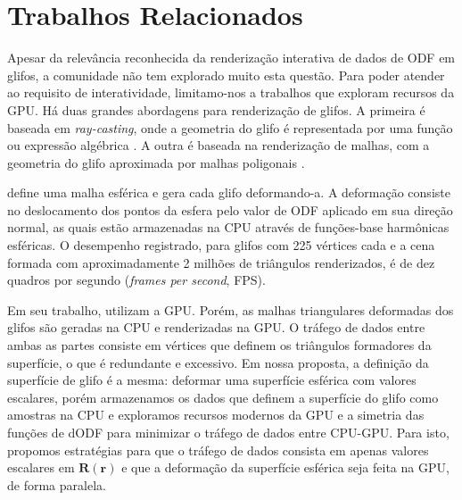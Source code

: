 \section{Trabalhos Relacionados}
\label{sec::trabalhos_relacionados}

Apesar da relevância reconhecida da renderização interativa de dados de ODF em glifos, a comunidade não tem explorado muito esta questão. Para poder atender ao requisito de interatividade, limitamo-nos a trabalhos que exploram recursos da GPU. Há duas grandes abordagens para renderização de glifos. A primeira é baseada em \textit{ray-casting}, onde a geometria do glifo é representada por uma função ou expressão algébrica \cite{peeters2009, almsick2011}. A outra é baseada na renderização de malhas, com a geometria do glifo aproximada por malhas poligonais \cite{shattuck2008}.

 define uma malha esférica e gera cada glifo deformando-a. A deformação consiste no deslocamento dos pontos da esfera pelo valor de ODF aplicado em sua direção normal, as quais estão armazenadas na CPU através de funções-base harmônicas esféricas. O desempenho registrado, para glifos com 225 vértices cada e a cena formada com aproximadamente 2 milhões de triângulos renderizados, é de dez quadros por segundo (\textit{frames per second}, FPS).


Em seu trabalho,  utilizam a GPU. Porém, as malhas triangulares deformadas dos glifos são geradas na CPU e renderizadas na GPU. O tráfego de dados entre ambas as partes consiste em vértices que definem os triângulos formadores da superfície, o que é redundante e excessivo. Em nossa proposta, a definição da superfície de glifo é a mesma: deformar uma superfície esférica com valores escalares, porém armazenamos os dados que definem a superfície do glifo como amostras na CPU e exploramos recursos modernos da GPU e a simetria das funções de dODF para minimizar o tráfego de dados entre CPU-GPU. Para isto, propomos estratégias para que o tráfego de dados consista em apenas valores escalares em $\mathbf{R}(\mathbf{r})$ e que a deformação da superfície esférica seja feita na GPU, de forma paralela.

